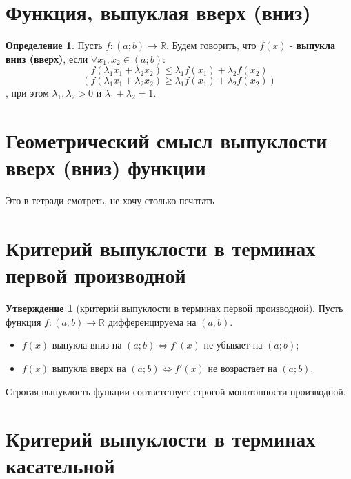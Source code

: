 \documentclass{report}
\theoremstyle{definition}
\newtheorem*{definition}{Определение}
\newtheorem*{statement}{Утверждение}
\begin{document}
\section{Функция, выпуклая вверх (вниз)}

\begin{definition}
    Пусть $f:(a;b) \rightarrow \mathbb{R}$. Будем говорить, что $f(x)$ - \textbf{выпукла вниз (вверх)},
    если $\forall x_1,x_2 \in (a;b)$:
    \begin{equation*}
        f(\lambda_1x_1 + \lambda_2x_2) \leqslant \lambda_1f(x_1) + \lambda_2f(x_2)
    \end{equation*}
    \begin{equation*}
        (f(\lambda_1x_1 + \lambda_2x_2) \geqslant \lambda_1f(x_1) + \lambda_2f(x_2))
    \end{equation*}, при этом $\lambda_1,\lambda_2 > 0$ и $\lambda_1 + \lambda_2 = 1$.
\end{definition}

\section{Геометрический смысл выпуклости вверх (вниз) функции}

Это в тетради смотреть, не хочу столько печатать

\section{Критерий выпуклости в терминах первой производной}

\begin{statement}[критерий выпуклости в терминах первой производной]
    Пусть функция $f:(a;b)\rightarrow\mathbb{R}$ дифференцируема на $(a;b)$.
    \begin{itemize}
        \item $f(x)$ выпукла вниз на $(a;b) \iff f'(x)$ не убывает на $(a;b)$;
        \item $f(x)$ выпукла вверх на $(a;b) \iff f'(x)$ не возрастает на $(a;b)$.
    \end{itemize}
    
    Строгая выпуклость функции соответствует строгой монотонности производной.
\end{statement}

\section{Критерий выпуклости в терминах касательной}
\end{document}
